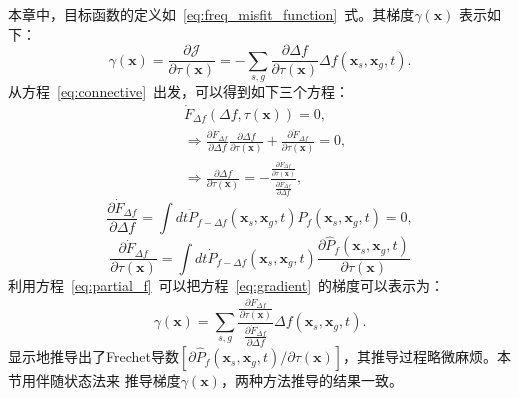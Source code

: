 本章中，目标函数的定义如~\ref{eq:freq_misfit_function}~式。其梯度$\gamma(\mathbf{x})$
表示如下：
\begin{equation}
	\gamma(\mathbf{x})=\frac{\partial\mathcal{J}}{\partial \tau(\mathbf{x})}
	=-\sum_{s,g}\frac{\partial \Delta f}{\partial \tau(\mathbf{x})}
	\Delta f(\mathbf{x}_s,\mathbf{x}_g,t).
	\label{eq:gradient}
\end{equation}
从方程~\ref{eq:connective}~出发，可以得到如下三个方程：
\begin{equation}
	\begin{aligned}
		 &\dot{F}_{\Delta f}(\Delta f,\tau(\mathbf{x}))=0, \\
		&\Rightarrow \frac{\partial \dot{F}_{\Delta f}}{\partial \Delta f} 
		\frac{\partial \Delta f}{\partial \tau(\mathbf{x})} + 
		\frac{\partial \dot{F}_{\Delta f}}{\partial\tau(\mathbf{x})} =0, \\
		&\Rightarrow \frac{\partial \Delta f}{\partial \tau(\mathbf{x})} =
		-\frac{\frac{\partial \dot{F}_{\Delta f}}{\partial\tau(\mathbf{x})}}
		{\frac{\partial \dot{F}_{\Delta f}}{\partial \Delta f}},
	\end{aligned}
	\label{eq:partial_f}
\end{equation}
\begin{equation}
	\frac{\partial \dot{F}_{\Delta f}}{\partial \Delta f} = \int dt 
	\ddot{P}_{f-\Delta f}(\mathbf{x}_s,\mathbf{x}_g,t)
	\hat{P}_f(\mathbf{x}_s,\mathbf{x}_g,t)=0,
\end{equation}
\begin{equation}
	\frac{\partial \dot{F}_{\Delta f}}{\partial\tau(\mathbf{x})} = \int dt
	\dot{P}_{f-\Delta f}(\mathbf{x}_s,\mathbf{x}_g,t) 
	\frac{\partial \hat{P}_f(\mathbf{x}_s,\mathbf{x}_g,t)}{\partial \tau(\mathbf{x})}
\end{equation}
利用方程~\ref{eq:partial_f}~可以把方程~\ref{eq:gradient}~的梯度可以表示为：
\begin{equation}
	\gamma(\mathbf{x})=\sum_{s,g}\frac{\frac{\partial \dot{F}_{\Delta f}}{\partial\tau(\mathbf{x})}}
	{\frac{\partial \dot{F}_{\Delta f}}{\partial \Delta f}}\Delta f(\mathbf{x}_s,\mathbf{x}_g,t).
\end{equation}
显示地推导出了Frechet导数$[\partial \hat{P}_f(\mathbf{x}_s,
\mathbf{x}_g,t)/\partial \tau(\mathbf{x})]$，其推导过程略微麻烦。本节用伴随状态法来
推导梯度$\gamma(\mathbf{x})$，两种方法推导的结果一致。

